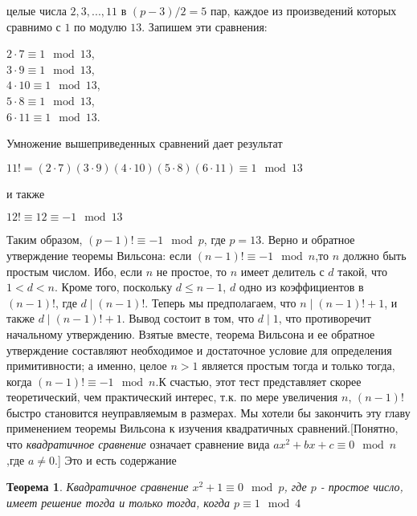 \documentclass[11pt]{article}
\newtheorem{theorem}{Теорема}
\begin{document}
целые числа $2, 3, ..., 11$ в $(p-3)/2=5$ пар, каждое из произведений которых сравнимо с $1$ по модулю $13$. Запишем эти сравнения: 
\begin{center}
	$2\cdot7\equiv 1\mod 13$,
	\\$3\cdot9\equiv 1\mod 13$,
	\\$4\cdot10\equiv 1\mod 13$,
	\\$5\cdot8\equiv 1\mod 13$,
	\\$6\cdot11\equiv 1\mod 13$.
\end{center}
Умножение вышеприведенных сравнений дает результат
\begin{center}
	$11! = (2\cdot7)(3\cdot9)(4\cdot10)(5\cdot8)(6\cdot11)\equiv1\mod13$
\end{center}
и также
\begin{center}
	$12!\equiv12\equiv-1\mod13$
\end{center}
Таким образом, $(p-1)!\equiv-1\mod p$, где $p=13$.
\parindent Верно и обратное утверждение теоремы Вильсона: если $(n-1)!\equiv-1\mod n$,то $n$ должно быть простым числом. Ибо, если $n$ не простое, то $n$ имеет делитель с $d$ такой, что $1<d<n$. Кроме того, поскольку $d\le n-1$, $d$ одно из коэффициентов в $(n-1)!$, где $d\mid(n-1)!$. Теперь мы предполагаем, что $n\mid(n-1)!+1$, и также $d\mid(n-1)!+1$. Вывод состоит в том, что $d\mid1$, что противоречит начальному утверждению.
\parindent Взятые вместе, теорема Вильсона и ее обратное утверждение составляют необходимое и достаточное условие для определения примитивности; а именно, целое $n>1$ является простым тогда и только тогда, когда $(n-1)!\equiv-1\mod n$.К счастью, этот тест представляет скорее теоретический, чем практический интерес, т.к. по мере увеличения $n$, $(n-1)!$ быстро становится неуправляемым в размерах.
\parindent Мы хотели бы закончить эту главу применением теоремы Вильсона к изучения квадратичных сравнений.[Понятно, что \textit{квадратичное сравнение} означает сравнение вида $ax^2+bx+c\equiv0\mod n$,где $a\neq0$.] Это и есть содержание
\begin{theorem}
	Квадратичное сравнение $x^2+1\equiv 0 \mod p$, где $p$ - простое число, имеет решение тогда и только тогда, когда $p\equiv 1\mod 4$
\end{theorem}
\end{document}
